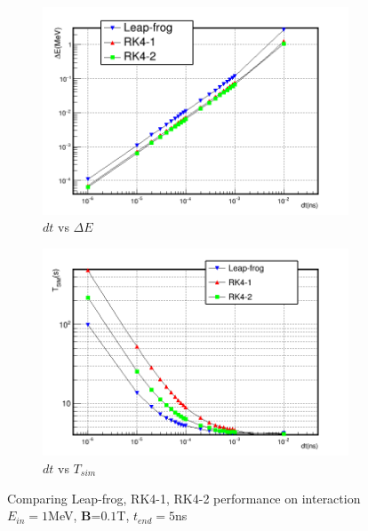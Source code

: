 \documentclass[a4paper,oneside,12pt]{report}
\numberwithin{equation}{chapter}
\begin{document}
\begin{figure}[H]
    \captionsetup[subfigure]{justification=centering}
    \captionsetup{justification=centering}
    \centering
    \begin{subfigure}{0.8\textwidth}
        \centering
        \includegraphics[width=\linewidth]{./figures/analiz/lf_rk1_rk2_dt-E_3.png}
        \caption*{$dt$ vs $\Delta E$}
    \end{subfigure}
    
    \begin{subfigure}{0.8\textwidth}
        \centering
        \includegraphics[width=\linewidth]{./figures/analiz/lf_rk1_rk2_dt-Tsim_3.png}
        \caption*{$dt$ vs $T_{sim}$}
    \end{subfigure}
    \caption{Comparing Leap-frog, RK4-1, RK4-2 performance on \eB interaction\\ $E_{in}=1$MeV, \textbf{B}=$0.1$T, $t_{end}=5$ns}
    \label{fig:lf_rk1_rk2_comparison}
\end{figure}
\end{document}
